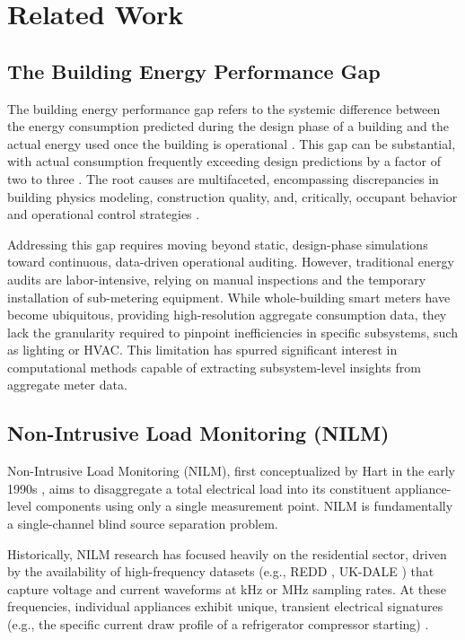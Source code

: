 \section{Related Work}

\subsection{The Building Energy Performance Gap}
The building energy performance gap refers to the systemic difference between the energy consumption predicted during the design phase of a building and the actual energy used once the building is operational \cite{performance_gap_1, performance_gap_2}. This gap can be substantial, with actual consumption frequently exceeding design predictions by a factor of two to three \cite{performance_gap_3}. The root causes are multifaceted, encompassing discrepancies in building physics modeling, construction quality, and, critically, occupant behavior and operational control strategies \cite{performance_gap_1}.

Addressing this gap requires moving beyond static, design-phase simulations toward continuous, data-driven operational auditing. However, traditional energy audits are labor-intensive, relying on manual inspections and the temporary installation of sub-metering equipment. While whole-building smart meters have become ubiquitous, providing high-resolution aggregate consumption data, they lack the granularity required to pinpoint inefficiencies in specific subsystems, such as lighting or HVAC. This limitation has spurred significant interest in computational methods capable of extracting subsystem-level insights from aggregate meter data.

\subsection{Non-Intrusive Load Monitoring (NILM)}
Non-Intrusive Load Monitoring (NILM), first conceptualized by Hart in the early 1990s \cite{hart_1992}, aims to disaggregate a total electrical load into its constituent appliance-level components using only a single measurement point. NILM is fundamentally a single-channel blind source separation problem.

Historically, NILM research has focused heavily on the residential sector, driven by the availability of high-frequency datasets (e.g., REDD \cite{redd_2011}, UK-DALE \cite{ukdale_2015}) that capture voltage and current waveforms at kHz or MHz sampling rates. At these frequencies, individual appliances exhibit unique, transient electrical signatures (e.g., the specific current draw profile of a refrigerator compressor starting) \cite{nilm_survey_1, nilm_survey_2}.

